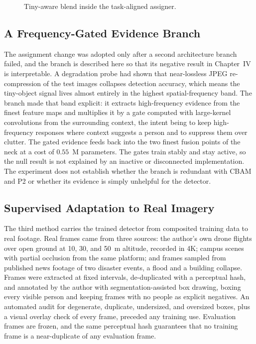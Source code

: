 \begin{figure}[tbp]
  \centering
  \caption{Tiny-aware blend inside the task-aligned assigner.}
  \label{fig:assignmech}
\end{figure}

\subsection{A Frequency-Gated Evidence Branch}
\label{sec:fccgmethod}
The assignment change was adopted only after a second architecture branch
failed, and the branch is described here so that its negative result in
Chapter~IV is interpretable. A degradation probe had shown that near-lossless
JPEG re-compression of the test images collapses detection accuracy, which
means the tiny-object signal lives almost entirely in the highest
spatial-frequency band. The branch made that band explicit: it extracts
high-frequency evidence from the finest feature maps and multiplies it by a
gate computed with large-kernel convolutions from the surrounding context, the
intent being to keep high-frequency responses where context suggests a person
and to suppress them over clutter. The gated evidence feeds back into the two
finest fusion points of the neck at a cost of $0.55$~M parameters. The gates
train stably and stay active, so the null result is not explained by an
inactive or disconnected implementation. The experiment does not establish
whether the branch is redundant with CBAM and P2 or whether its evidence is
simply unhelpful for the detector.

\subsection{Supervised Adaptation to Real Imagery}
\label{sec:adaptmethod}
The third method carries the trained detector from composited training data to
real footage. Real frames came from three sources: the author's own drone
flights over open ground at 10, 30, and 50~m altitude, recorded in 4K; campus
scenes with partial occlusion from the same platform; and frames sampled from
published news footage of two disaster events, a flood and a building
collapse. Frames were extracted at fixed intervals, de-duplicated with a
perceptual hash, and annotated by the author with segmentation-assisted box
drawing, boxing every visible person and keeping frames with no people as
explicit negatives. An automated audit for degenerate, duplicate, undersized,
and oversized boxes, plus a visual overlay check of every frame, preceded any
training use. Evaluation frames are frozen, and the same perceptual hash
guarantees that no training frame is a near-duplicate of any evaluation frame.

